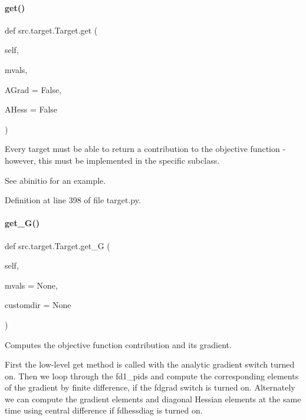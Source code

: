 \paragraph{\texorpdfstring{get()}{get()}}
{\footnotesize\ttfamily def src.\+target.\+Target.\+get (\begin{DoxyParamCaption}\item[{}]{self,  }\item[{}]{mvals,  }\item[{}]{A\+Grad = {\ttfamily False},  }\item[{}]{A\+Hess = {\ttfamily False} }\end{DoxyParamCaption})}



Every target must be able to return a contribution to the objective function -\/ however, this must be implemented in the specific subclass. 

See abinitio for an example. 

Definition at line 398 of file target.\+py.

\mbox{\label{classsrc_1_1target_1_1Target_abd888e5a08e9858fcf72dbad7133d538}} 
\paragraph{\texorpdfstring{get\+\_\+\+G()}{get\_G()}}
{\footnotesize\ttfamily def src.\+target.\+Target.\+get\+\_\+G (\begin{DoxyParamCaption}\item[{}]{self,  }\item[{}]{mvals = {\ttfamily None},  }\item[{}]{customdir = {\ttfamily None} }\end{DoxyParamCaption})}



Computes the objective function contribution and its gradient. 

First the low-\/level \textquotesingle{}get\textquotesingle{} method is called with the analytic gradient switch turned on. Then we loop through the fd1\+\_\+pids and compute the corresponding elements of the gradient by finite difference, if the \textquotesingle{}fdgrad\textquotesingle{} switch is turned on. Alternately we can compute the gradient elements and diagonal Hessian elements at the same time using central difference if \textquotesingle{}fdhessdiag\textquotesingle{} is turned on.

